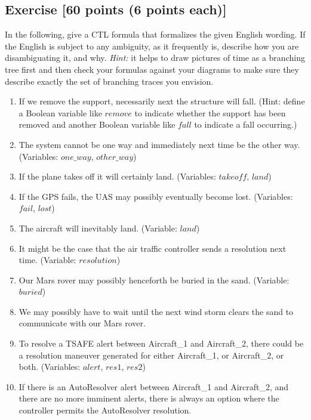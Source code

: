 \documentclass{elsarticle} %
\begin{document}




\subsection{Exercise [60 points (6 points each)]}
In the following, give a CTL formula that formalizes the given English wording. If the English is subject to any ambiguity, as it frequently is, describe how you are disambiguating it, and why. \emph{Hint:} it helps to draw pictures of time as a branching tree first and then check your formulas against your diagrams to make sure they describe exactly the set of branching traces you envision.
\begin{enumerate}
\item If we remove the support, necessarily next the structure will fall. (Hint: define a Boolean variable like $remove$ to indicate whether the support has been removed and another Boolean variable like $fall$ to indicate a fall occurring.) %
\item The system cannot be one way and immediately next time be the other way. (Variables: $one\_way$, $other\_way$)
\item If the plane takes off it will certainly land. (Variables: $takeoff$, $land$) %
\item If the GPS fails, the UAS may possibly eventually become lost. (Variables: $fail$, $lost$) %
\item The aircraft will inevitably land. (Variable: $land$) %
\item It might be the case that the air traffic controller sends a resolution next time. (Variable: $resolution$) %
\item Our Mars rover may possibly henceforth be buried in the sand. (Variable: $buried$) %
\item We may possibly have to wait until the next wind storm clears the sand to communicate with our Mars rover. %
\item To resolve a TSAFE alert between Aircraft\_1 and Aircraft\_2, there could be a resolution maneuver generated for either Aircraft\_1, or Aircraft\_2, or both. (Variables: $alert$, $res1$, $res2$)
\item If there is an AutoResolver alert between Aircraft\_1 and Aircraft\_2, and there are
no more imminent alerts, there is always an option where
the controller permits the AutoResolver resolution. %
\end{enumerate}
\end{document}
